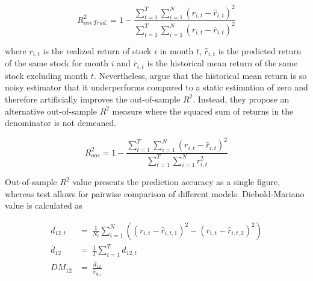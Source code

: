 \documentclass[12pt]{article}
\begin{document}
\begin{equation}
\label{eq:r2Trad}
R^{2}_{oos \ Trad.} = 1 - \frac{\sum^T_{t=1} \sum^N_{i=1} (r_{i, t} - \hat r_{i, t})^2}{ \sum^T_{t=1} \sum^N_{i=1} (r_{i, t} - \overline{r}_{i, t} )^2}
\end{equation}

where $r_{i, t}$ is the realized return of stock $i$ in month $t$, $\hat r_{i, t}$ is the predicted return of the same stock for month $i$ and $\overline{r}_{i, t}$ is the historical mean return of the same stock excluding month $t$. Nevertheless, \citet{guetal} argue that the historical mean return is so noisy estimator that it underperforms compared to a static estimation of zero and therefore artificially improves the out-of-sample $R^{2}$.\footnotemark {} Instead, they propose an alternative out-of-sample $R^{2}$ measure where the squared sum of returns in the denominator is not demeaned. \par

\begin{equation}
\label{eq:r2}
R^{2}_{oos} = 1 - \frac{\sum^T_{t=1} \sum^N_{i=1} (r_{i, t} - \hat r_{i, t})^2}{ \sum^T_{t=1} \sum^N_{i=1} r^2_{i, t}}
\end{equation}

Out-of-sample $R^2$ value presents the prediction accuracy as a single figure, whereas \citet{Diebold1995} test allows for pairwise comparison of different models. Diebold-Mariano value is calculated as \par

\begin{equation}
\label{eq:Diebold-Mariano}
\begin{split}
 d_{12, t} 			& = \ \frac{1}{N_{t}}  \sum^N_{i=1}((r_{i, t} - \hat r_{i, t, 1})^2 - (r_{i, t} - \hat r_{i, t, 2})^2) \\
\overline{d}_{12} 	& = \ \frac{1}{T} \sum^T_{t=1} d_{12, t} \\
DM_{12} 			& = \ \frac{\overline{d}_{12}}{\hat \sigma_{d_{12}}} \\
\end{split}
\end{equation}
\end{document}
